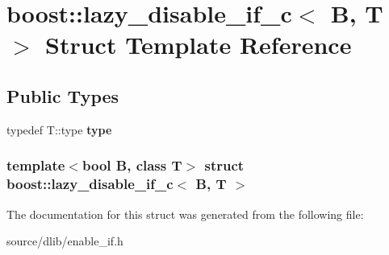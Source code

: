 \hypertarget{structboost_1_1lazy__disable__if__c}{
\section{boost::lazy\_\-disable\_\-if\_\-c$<$ B, T $>$ Struct Template Reference}
\label{structboost_1_1lazy__disable__if__c}
}
\subsection*{Public Types}
\begin{DoxyCompactItemize}
\item 
\hypertarget{structboost_1_1lazy__disable__if__c_ac7a275a383b5bae04cf23cfe7948a68a}{
typedef T::type {\bfseries type}}
\label{structboost_1_1lazy__disable__if__c_ac7a275a383b5bae04cf23cfe7948a68a}

\end{DoxyCompactItemize}
\subsubsection*{template$<$bool B, class T$>$ struct boost::lazy\_\-disable\_\-if\_\-c$<$ B, T $>$}



The documentation for this struct was generated from the following file:\begin{DoxyCompactItemize}
\item 
source/dlib/enable\_\-if.h\end{DoxyCompactItemize}
